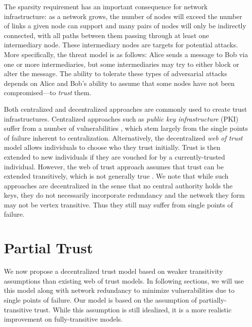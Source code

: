 \documentclass{sig-alternate-05-2015}
\begin{document}
The sparsity requirement has an important consequence for network infrastructure:
as a network grows, the number of nodes will exceed the number of links a given
node can support and many pairs of nodes will only be indirectly connected,
with all paths between them passing through at least one intermediary node.
These intermediary nodes are targets for potential attacks.
More specifically, the threat model is as follows: Alice sends a message to
Bob via one or more intermediaries, but some intermediaries may try to
either block or alter the message.
The ability to tolerate these types of adversarial attacks depends on
Alice and Bob's ability to assume that some nodes have not been
compromised---to {\em trust} them.

Both centralized and decentralized approaches are commonly used to create
trust infrastructures.
Centralized approaches such as {\em public key infrastructure} (PKI)
suffer from a number of vulnerabilities
\cite{ellison_ten_2000},
which stem largely from the single points of failure inherent to
centralization.
Alternatively, the decentralized {\em web of trust} model
\cite{zimmermann_official_1995,ferguson_practical_2003}
allows individuals
to choose who they trust initially.
Trust is then extended to new individuals if they are vouched for by a
currently-trusted individual.
However, the web of trust approach assumes that trust can be extended
transitively,
which is not generally true
\cite{christianson_why_1997}.
We note that while such approaches are decentralized in the sense that no central authority holds the keys,
they do not necessarily incorporate redundancy and the network they form may not be vertex transitive. Thus they still may suffer from single
points of failure.

\section{Partial Trust}

We now propose a decentralized trust model based on weaker transitivity
assumptions than existing web of trust models.
In following sections, we will use this model along with network redundancy to minimize vulnerabilities due to single points of failure.
Our model is based on the assumption of partially-transitive trust.
While this assumption is still idealized, it is a more realistic improvement
on fully-transitive models.
\end{document}
